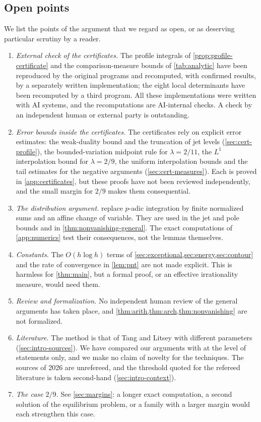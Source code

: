 \subsection{Open points}\label{sec:open}
We list the points of the argument that we regard as open, or as deserving particular scrutiny by a reader.
\begin{enumerate}[(1)]
\item \emph{External check of the certificates.} The profile integrals of \cref{prop:profile-certificate} and the comparison-measure bounds of \cref{tab:analytic} have been reproduced by the original programs and recomputed, with confirmed results, by a separately written implementation; the eight local determinants have been recomputed by a third program. All these implementations were written with AI systems, and the recomputations are AI-internal checks. A check by an independent human or external party is outstanding.
\item \emph{Error bounds inside the certificates.} The certificates rely on explicit error estimates: the weak-duality bound and the truncation of jet levels (\cref{sec:cert-profile}), the bounded-variation midpoint rule for $\lambda=2/11$, the $L^1$ interpolation bound for $\lambda=2/9$, the uniform interpolation bounds and the tail estimates for the negative arguments (\cref{sec:cert-measures}). Each is proved in \cref{app:certificates}, but these proofs have not been reviewed independently, and the small margin for $2/9$ makes them consequential.
\item \emph{The distribution argument.}  replace $p$-adic integration by finite normalized sums and an affine change of variable. They are used in the jet and pole bounds and in \cref{thm:nonvanishing-general}. The exact computations of \cref{app:numerics} test their consequences, not the lemmas themselves.
\item \emph{Constants.} The $O(h\log h)$ terms of \cref{sec:exceptional,sec:energy,sec:contour} and the rate of convergence in \cref{lem:pnt} are not made explicit. This is harmless for \cref{thm:main}, but a formal proof, or an effective irrationality measure, would need them.
\item \emph{Review and formalization.} No independent human review of the general arguments has taken place, and \cref{thm:arith,thm:arch,thm:nonvanishing} are not formalized.
\item \emph{Literature.} The method is that of Tang and Litsey with different parameters (\cref{sec:intro-sources}). We have compared our arguments with \cite{Litsey2026Li2} at the level of statements only, and we make no claim of novelty for the techniques. The sources of 2026 are unrefereed, and the threshold quoted for the refereed literature is taken second-hand (\cref{sec:intro-context}).
\item \emph{The case $2/9$.} See \cref{sec:margins}: a longer exact computation, a second solution of the equilibrium problem, or a family with a larger margin would each strengthen this case.
\end{enumerate}
